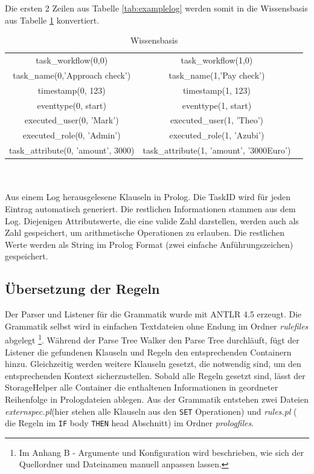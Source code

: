 \newpage
Die ersten 2 Zeilen aus Tabelle \ref{tab:examplelog} werden somit in die Wissensbasis aus Tabelle \ref{tab:knowledge} konvertiert.
\begin{table}[h!]
\begin{tabular}{ccc}
task{\_}workflow(0,0)&task{\_}workflow(1,0)\\
task{\_}name(0,'Approach check')&task{\_}name(1,'Pay check')\\
timestamp(0, 123)&timestamp(1, 123)\\
eventtype(0, start)&eventtype(1, start)\\
executed{\_}user(0, 'Mark')&executed{\_}user(1, 'Theo')\\
executed{\_}role(0, 'Admin')&executed{\_}role(1, 'Azubi')\\
task\_attribute(0, 'amount', 3000)& task\_attribute(1, 'amount', '3000Euro')\\
\end{tabular}\\\\
\small Aus einem Log herausgelesene Klauseln in Prolog. Die TaskID wird für jeden Eintrag automatisch generiert. Die restlichen Informationen stammen aus dem Log. Diejenigen Attributswerte, die eine valide Zahl darstellen, werden auch als Zahl gespeichert, um arithmetische Operationen zu erlauben. Die restlichen Werte werden als String im Prolog Format (zwei einfache Anführungszeichen) gespeichert. 
\caption{Wissensbasis}
\label{tab:knowledge}
\end{table}


%
%
\subsection{Übersetzung der Regeln}
\label{sec:constraintreader}

Der Parser und Listener für die Grammatik wurde mit ANTLR 4.5 \cite{antlr} erzeugt. Die Grammatik selbst wird in einfachen Textdateien ohne Endung im Ordner \textit{rulefiles} abgelegt \footnote{Im Anhang B - Argumente und Konfiguration wird beschrieben, wie sich der Quellordner und Dateinamen manuell anpassen lassen.}. Während der Parse Tree Walker den Parse Tree durchläuft, fügt der Listener die gefundenen Klauseln und Regeln den entsprechenden Containern hinzu. Gleichzeitig werden weitere Klauseln gesetzt, die notwendig sind, um den entsprechenden Kontext sicherzustellen. Sobald alle Regeln gesetzt sind, lässt der StorageHelper alle Container die enthaltenen Informationen in geordneter Reihenfolge in Prologdateien ablegen. Aus der Grammatik entstehen zwei Dateien \textit{externspec.pl}(hier stehen alle Klauseln aus den \texttt{SET} Operationen) und \textit{rules.pl} ( die Regeln im \texttt{IF} body \texttt{THEN} head Abschnitt) im Ordner \textit{prologfiles}.\\

